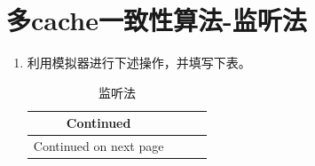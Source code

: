 \documentclass{ctexart}
\begin{document}
\section{\hei 多cache一致性算法-监听法}
\begin{enumerate}
    \item 利用模拟器进行下述操作，并填写下表。
    \begin{longtable}{|l|l|l|l|}

        \caption{监听法}\label{tab1}


        \endfirsthead

        \multicolumn{1}{c}{Continued}                   \\

        \endhead


        \multicolumn{1}{c}{Continued on next page}
        \endfoot



\end{longtable}
\end{enumerate}
\end{document}
